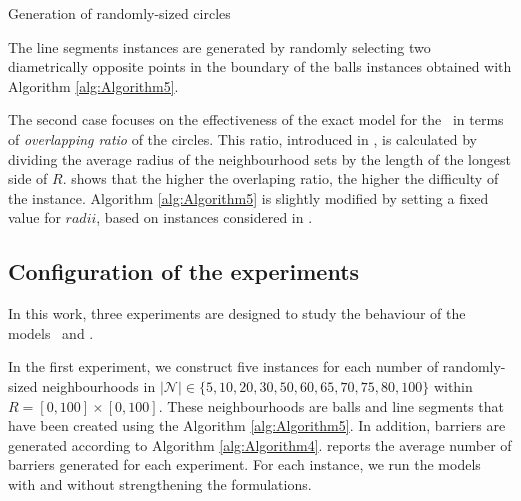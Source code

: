 \documentclass[a4paper,  review, authoryear, 1p.]{elsarticle}
\newcommand{\TSPHN}{{\sf{H-TSPHN}\xspace }}
\newcommand{\TSPN}{{\sf{H-TSPN}\xspace }}
\newcommand{\CV}[1]{{\color{red}#1}}
\begin{document}
\begin{algorithm}[H]
	\caption{Generation of randomly-sized circles}
	\label{alg:Algorithm5}
	
\end{algorithm}

The line segments instances are generated by randomly selecting two diametrically opposite points in the boundary of the balls instances obtained with Algorithm \ref{alg:Algorithm5}.


The second case focuses on the effectiveness of the exact model for the \TSPN \ in terms of \emph{overlapping ratio} of the circles. This ratio, introduced in \cite{mennell2009a}, is calculated by dividing the average radius of the neighbourhood sets by the length of the longest side of $R$. \cite{mennell2009a} shows that the higher the overlaping ratio, the higher the difficulty of the instance. Algorithm \ref{alg:Algorithm5} is slightly modified by setting a fixed value for $radii$, based on instances considered in \cite{behdani2014}.



\subsection{Configuration of the experiments}
In this work, \CV{three} experiments are designed to study the behaviour of the models \TSPHN \ and \TSPN. 

In the first experiment, we construct five instances for each number of randomly-sized neighbourhoods in $|\mathcal N|\in\{5, 10, 20, 30, 50, 60, 65, 70, 75, 80, 100\}$ within $R=[0,100]\times[0, 100]$. These neighbourhoods are balls and line segments that have been created using the Algorithm \ref{alg:Algorithm5}. \CV{In addition, barriers are generated according to Algorithm \ref{alg:Algorithm4}. \boldsymbol{$|\mathcal B|$} reports the average number of barriers generated for each experiment.} For each instance, we run the models with and without strengthening the formulations.
\end{document}
